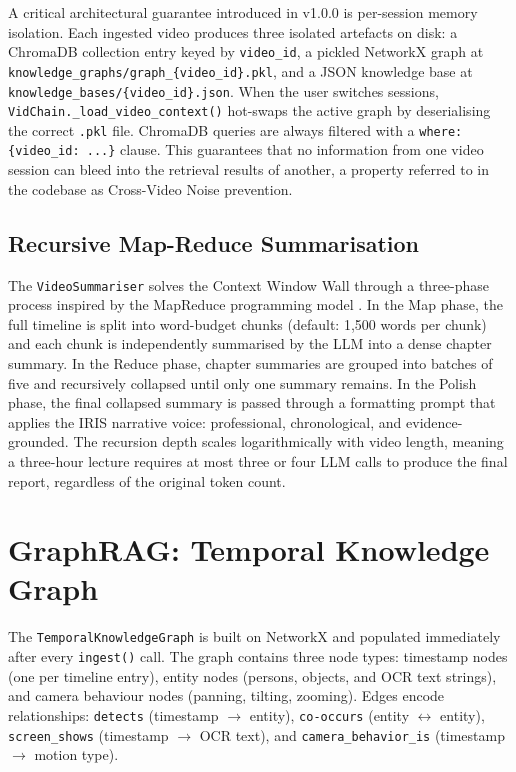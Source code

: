 A critical architectural guarantee introduced in v1.0.0 is per-session memory isolation. Each ingested video produces three isolated artefacts on disk: a ChromaDB \cite{chromadb} collection entry keyed by \texttt{video\_id}, a pickled NetworkX \cite{networkx} graph at \texttt{knowledge\_graphs/graph\_\{video\_id\}.pkl}, and a JSON knowledge base at \texttt{knowledge\_bases/\{video\_id\}.json}. When the user switches sessions, \texttt{VidChain.\_load\_video\_context()} hot-swaps the active graph by deserialising the correct \texttt{.pkl} file. ChromaDB queries are always filtered with a \texttt{where: \{video\_id: ...\}} clause. This guarantees that no information from one video session can bleed into the retrieval results of another, a property referred to in the codebase as Cross-Video Noise prevention.

\subsection{Recursive Map-Reduce Summarisation}

The \texttt{VideoSummariser} solves the Context Window Wall through a three-phase process inspired by the MapReduce programming model \cite{mapreduce}. In the Map phase, the full timeline is split into word-budget chunks (default: 1,500 words per chunk) and each chunk is independently summarised by the LLM into a dense chapter summary. In the Reduce phase, chapter summaries are grouped into batches of five and recursively collapsed until only one summary remains. In the Polish phase, the final collapsed summary is passed through a formatting prompt that applies the IRIS narrative voice: professional, chronological, and evidence-grounded. The recursion depth scales logarithmically with video length, meaning a three-hour lecture requires at most three or four LLM calls to produce the final report, regardless of the original token count.

\section{GraphRAG: Temporal Knowledge Graph}

The \texttt{TemporalKnowledgeGraph} is built on NetworkX \cite{networkx} and populated immediately after every \texttt{ingest()} call. The graph contains three node types: timestamp nodes (one per timeline entry), entity nodes (persons, objects, and OCR text strings), and camera behaviour nodes (panning, tilting, zooming). Edges encode relationships: \texttt{detects} (timestamp $\to$ entity), \texttt{co-occurs} (entity $\leftrightarrow$ entity), \texttt{screen\_shows} (timestamp $\to$ OCR text), and \texttt{camera\_behavior\_is} (timestamp $\to$ motion type).

